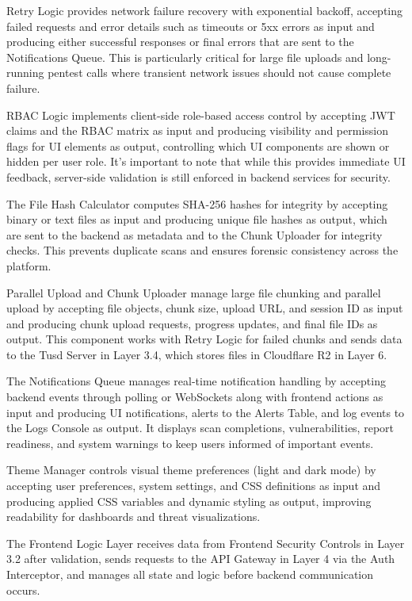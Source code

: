 \documentclass[12pt,a4paper]{report}
\begin{document}
Retry Logic provides network failure recovery with exponential backoff, accepting failed requests and error details such as timeouts or 5xx errors as input and producing either successful responses or final errors that are sent to the Notifications Queue. This is particularly critical for large file uploads and long-running pentest calls where transient network issues should not cause complete failure.

RBAC Logic implements client-side role-based access control by accepting JWT claims and the RBAC matrix as input and producing visibility and permission flags for UI elements as output, controlling which UI components are shown or hidden per user role. It's important to note that while this provides immediate UI feedback, server-side validation is still enforced in backend services for security.

The File Hash Calculator computes SHA-256 hashes for integrity by accepting binary or text files as input and producing unique file hashes as output, which are sent to the backend as metadata and to the Chunk Uploader for integrity checks. This prevents duplicate scans and ensures forensic consistency across the platform.

Parallel Upload and Chunk Uploader manage large file chunking and parallel upload by accepting file objects, chunk size, upload URL, and session ID as input and producing chunk upload requests, progress updates, and final file IDs as output. This component works with Retry Logic for failed chunks and sends data to the Tusd Server in Layer 3.4, which stores files in Cloudflare R2 in Layer 6.

The Notifications Queue manages real-time notification handling by accepting backend events through polling or WebSockets along with frontend actions as input and producing UI notifications, alerts to the Alerts Table, and log events to the Logs Console as output. It displays scan completions, vulnerabilities, report readiness, and system warnings to keep users informed of important events.

Theme Manager controls visual theme preferences (light and dark mode) by accepting user preferences, system settings, and CSS definitions as input and producing applied CSS variables and dynamic styling as output, improving readability for dashboards and threat visualizations.

The Frontend Logic Layer receives data from Frontend Security Controls in Layer 3.2 after validation, sends requests to the API Gateway in Layer 4 via the Auth Interceptor, and manages all state and logic before backend communication occurs.
\end{document}
